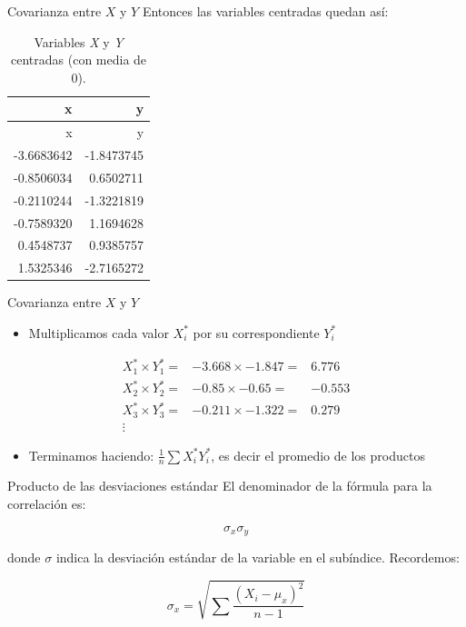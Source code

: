 \documentclass[
  11pt,
  ignorenonframetext,
]{beamer}
\providecommand{\tightlist}{%
  \setlength{\itemsep}{0pt}\setlength{\parskip}{0pt}}
\begin{document}
\begin{frame}{Covarianza entre \(X\) y \(Y\)}
\protect\hypertarget{covarianza-entre-x-y-y-2}{}
Entonces las variables centradas quedan así:

\begin{longtable}[]{@{}rr@{}}
\caption{Variables \emph{X} y \emph{Y} centradas (con media de
0).}\tabularnewline
\toprule()
x & y \\
\midrule()
\endfirsthead
\toprule()
x & y \\
\midrule()
\endhead
-3.6683642 & -1.8473745 \\
-0.8506034 & 0.6502711 \\
-0.2110244 & -1.3221819 \\
-0.7589320 & 1.1694628 \\
0.4548737 & 0.9385757 \\
1.5325346 & -2.7165272 \\
\bottomrule()
\end{longtable}
\end{frame}

\begin{frame}{Covarianza entre \(X\) y \(Y\)}
\protect\hypertarget{covarianza-entre-x-y-y-3}{}
\begin{itemize}
\tightlist
\item
  Multiplicamos cada valor \(X^*_i\) por su correspondiente \(Y^*_i\)
\end{itemize}

\begin{align*}
X^*_1 \times Y^*_1 =  & -3.668 \times -1.847 = & 6.776 \\
X^*_2 \times Y^*_2 =  & -0.85 \times -0.65 = & -0.553 \\
X^*_3 \times Y^*_3 =  & -0.211 \times -1.322 = & 0.279 \\
\vdots
\end{align*}

\begin{itemize}
\tightlist
\item
  Terminamos haciendo: \(\frac{1}{n}\sum X^*_i Y^*_i\), es decir el
  promedio de los productos
\end{itemize}
\end{frame}

\begin{frame}{Producto de las desviaciones estándar}
\protect\hypertarget{producto-de-las-desviaciones-estuxe1ndar}{}
El denominador de la fórmula para la correlación es:

\begin{equation*}
\sigma_x \sigma_y
\end{equation*}

donde \(\sigma\) indica la desviación estándar de la variable en el
subíndice. Recordemos:

\begin{equation}
\sigma_x = \sqrt{\sum \frac{(X_i - \mu_x)^2}{n-1}}
\end{equation}
\end{frame}
\end{document}
